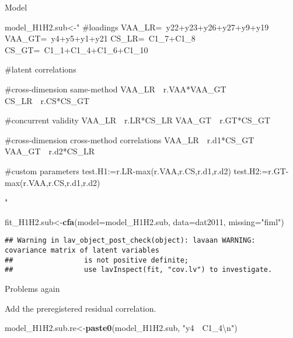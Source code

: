 \documentclass[
]{article}
\newenvironment{Shaded}{\begin{snugshade}}{\end{snugshade}}
\newcommand{\CharTok}[1]{\textcolor[rgb]{0.31,0.60,0.02}{#1}}
\newcommand{\DataTypeTok}[1]{\textcolor[rgb]{0.13,0.29,0.53}{#1}}
\newcommand{\KeywordTok}[1]{\textcolor[rgb]{0.13,0.29,0.53}{\textbf{#1}}}
\newcommand{\NormalTok}[1]{#1}
\newcommand{\StringTok}[1]{\textcolor[rgb]{0.31,0.60,0.02}{#1}}
\begin{document}
Model

\begin{Shaded}
\begin{Highlighting}[]
\NormalTok{model_H1H2.sub<-}\StringTok{"}
\StringTok{#loadings}
\StringTok{VAA_LR=~y22+y23+y26+y27+y9+y19}
\StringTok{VAA_GT=~y4+y5+y1+y21}
\StringTok{CS_LR=~C1_7+C1_8}
\StringTok{CS_GT=~C1_1+C1_4+C1_6+C1_10}

\StringTok{#latent correlations}

\StringTok{#cross-dimension same-method}
\StringTok{VAA_LR~~r.VAA*VAA_GT}
\StringTok{CS_LR~~r.CS*CS_GT}

\StringTok{#concurrent validity}
\StringTok{VAA_LR~~r.LR*CS_LR}
\StringTok{VAA_GT~~r.GT*CS_GT}

\StringTok{#cross-dimension cross-method correlations}
\StringTok{VAA_LR~~r.d1*CS_GT}
\StringTok{VAA_GT~~r.d2*CS_LR}

\StringTok{#custom parameters}
\StringTok{test.H1:=r.LR-max(r.VAA,r.CS,r.d1,r.d2)}
\StringTok{test.H2:=r.GT-max(r.VAA,r.CS,r.d1,r.d2)}

\StringTok{"}
\end{Highlighting}
\end{Shaded}

\begin{Shaded}
\begin{Highlighting}[]
\NormalTok{fit_H1H2.sub<-}\KeywordTok{cfa}\NormalTok{(}\DataTypeTok{model=}\NormalTok{model_H1H2.sub,}
              \DataTypeTok{data=}\NormalTok{dat2011,}
              \DataTypeTok{missing=}\StringTok{"fiml"}\NormalTok{)}
\end{Highlighting}
\end{Shaded}

\begin{verbatim}
## Warning in lav_object_post_check(object): lavaan WARNING: covariance matrix of latent variables
##                 is not positive definite;
##                 use lavInspect(fit, "cov.lv") to investigate.
\end{verbatim}

Problems again

Add the preregistered residual correlation.

\begin{Shaded}
\begin{Highlighting}[]
\NormalTok{model_H1H2.sub.re<-}\KeywordTok{paste0}\NormalTok{(model_H1H2.sub,}
                      \StringTok{"y4~~C1_4}\CharTok{\textbackslash{}n}\StringTok{"}\NormalTok{)}
\end{Highlighting}
\end{Shaded}
\end{document}
